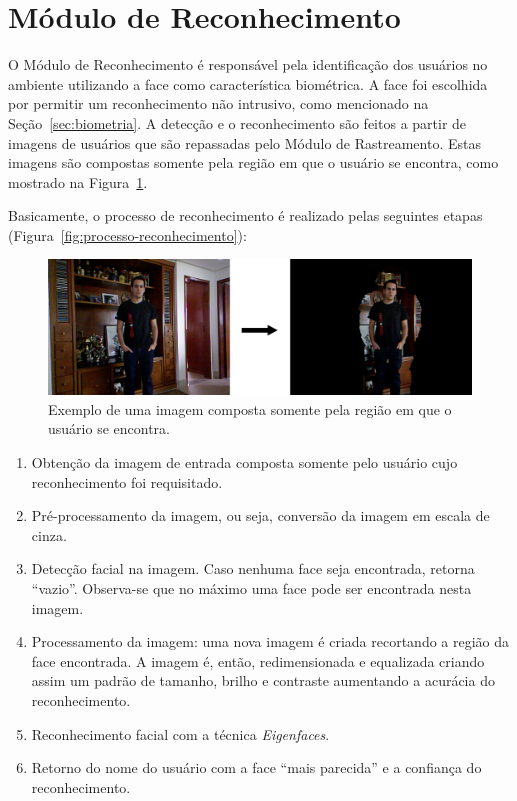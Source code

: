 \section{Módulo de Reconhecimento}

	O Módulo de Reconhecimento é responsável pela identificação dos usuários no ambiente utilizando a face como característica biométrica. A face foi escolhida por permitir um reconhecimento não intrusivo, como mencionado na Seção~\ref{sec:biometria}. A detecção e o reconhecimento são feitos a partir de imagens de usuários que são repassadas pelo Módulo de Rastreamento. Estas imagens são compostas somente pela região em que o usuário se encontra, como mostrado na Figura~\ref{fig:users-img}.

	Basicamente, o processo de reconhecimento é realizado pelas seguintes etapas (Figura~\ref{fig:processo-reconhecimento}):

		\begin{figure}[htb]
			\begin{center}
				\includegraphics[scale=0.3]{figuras/4.ProblemaEProposta/users-img.png}
			\end{center}
			\caption{Exemplo de uma imagem composta somente pela região em que o usuário se encontra.}
			\label{fig:users-img}
		\end{figure}

		\begin{enumerate}
			\item Obtenção da imagem de entrada composta somente pelo usuário cujo reconhecimento foi requisitado.
			\item Pré-processamento da imagem, ou seja, conversão da imagem em escala de cinza.
			\item Detecção facial na imagem. Caso nenhuma face seja encontrada, retorna ``vazio''. Observa-se que no máximo uma face pode ser encontrada nesta imagem.
			\item Processamento da imagem: uma nova imagem é criada recortando a região da face encontrada. A imagem é, então, redimensionada e equalizada criando assim um padrão de tamanho, brilho e contraste aumentando a acurácia do reconhecimento.
			\item Reconhecimento facial com a técnica \textit{Eigenfaces}.
			\item Retorno do nome do usuário com a face ``mais parecida'' e a confiança do reconhecimento.
		\end{enumerate}

